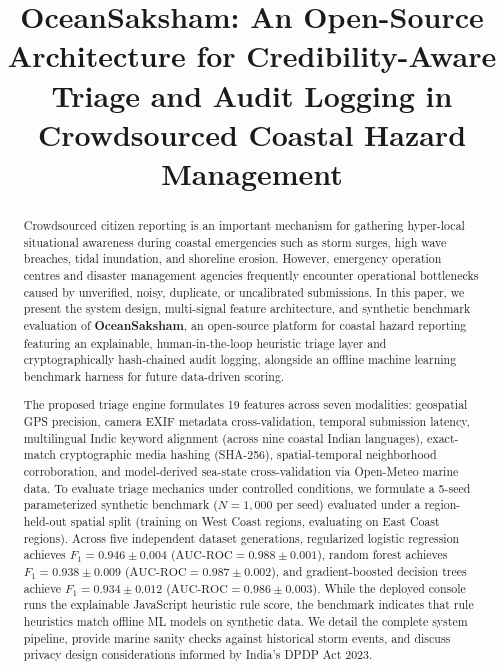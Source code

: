 \documentclass[conference]{IEEEtran}
\begin{document}
\title{OceanSaksham: An Open-Source Architecture for Credibility-Aware Triage and Audit Logging in Crowdsourced Coastal Hazard Management}

\author{
}

\maketitle

\begin{abstract}
Crowdsourced citizen reporting is an important mechanism for gathering hyper-local situational awareness during coastal emergencies such as storm surges, high wave breaches, tidal inundation, and shoreline erosion. However, emergency operation centres and disaster management agencies frequently encounter operational bottlenecks caused by unverified, noisy, duplicate, or uncalibrated submissions. In this paper, we present the system design, multi-signal feature architecture, and synthetic benchmark evaluation of \textbf{OceanSaksham}, an open-source platform for coastal hazard reporting featuring an explainable, human-in-the-loop heuristic triage layer and cryptographically hash-chained audit logging, alongside an offline machine learning benchmark harness for future data-driven scoring.

The proposed triage engine formulates 19 features across seven modalities: geospatial GPS precision, camera EXIF metadata cross-validation, temporal submission latency, multilingual Indic keyword alignment (across nine coastal Indian languages), exact-match cryptographic media hashing (SHA-256), spatial-temporal neighborhood corroboration, and model-derived sea-state cross-validation via Open-Meteo marine data. To evaluate triage mechanics under controlled conditions, we formulate a 5-seed parameterized synthetic benchmark ($N=1,000$ per seed) evaluated under a region-held-out spatial split (training on West Coast regions, evaluating on East Coast regions). Across five independent dataset generations, regularized logistic regression achieves $F_1 = 0.946 \pm 0.004$ ($\text{AUC-ROC} = 0.988 \pm 0.001$), random forest achieves $F_1 = 0.938 \pm 0.009$ ($\text{AUC-ROC} = 0.987 \pm 0.002$), and gradient-boosted decision trees achieve $F_1 = 0.934 \pm 0.012$ ($\text{AUC-ROC} = 0.986 \pm 0.003$). While the deployed console runs the explainable JavaScript heuristic rule score, the benchmark indicates that rule heuristics match offline ML models on synthetic data. We detail the complete system pipeline, provide marine sanity checks against historical storm events, and discuss privacy design considerations informed by India's DPDP Act 2023.
\end{abstract}
\end{document}
